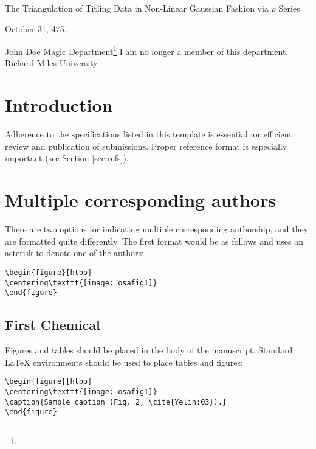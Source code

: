 \documentclass[twocolumn]{article}
\begin{document}
 

\title{} The Triangulation of Titling Data in
       Non-Linear Gaussian Fashion via $\rho$ Series\date{} October 31, 475.
\author{}John Doe Magic Department\thanks{} I am no longer a member of this department, Richard Miles University.
 
\begin{abstract}
    \LaTeX{} manuscripts submitted to OSA journals may use these instructions and this universal template format. The template simplifies manuscript preparation and eases transfer between OSA journals. Applied Optics, JOSA A, JOSA B, Optics Letters, and Optica authors may also use the previous, legacy templates, particularly if a precise length estimate is needed. Authors will still need to adhere to article-length restrictions based on the final, published format.
\end{abstract}

\section {Introduction}
Adherence to the specifications listed in this template is essential for efficient review and publication of submissions. Proper reference format is especially important (see Section \ref{sec:refs}).

\section{Multiple corresponding authors}
There are two options for indicating multiple corresponding authorship, and they are formatted quite differently. The first format would be as follows and uses an asterisk to denote one of the authors:
\begin{verbatim}
\begin{figure}[htbp]
\centering\texttt{[image: osafig1]}
\end{figure}
\end{verbatim}

\subsection{First Chemical}
Figures and tables should be placed in the body of the manuscript. Standard \LaTeX{} environments should be used to place tables and figures:
\begin{verbatim}
\begin{figure}[htbp]
\centering\texttt{[image: osafig1]}
\caption{Sample caption (Fig. 2, \cite{Yelin:03}).}
\end{figure}
\end{verbatim}
\end{document}
